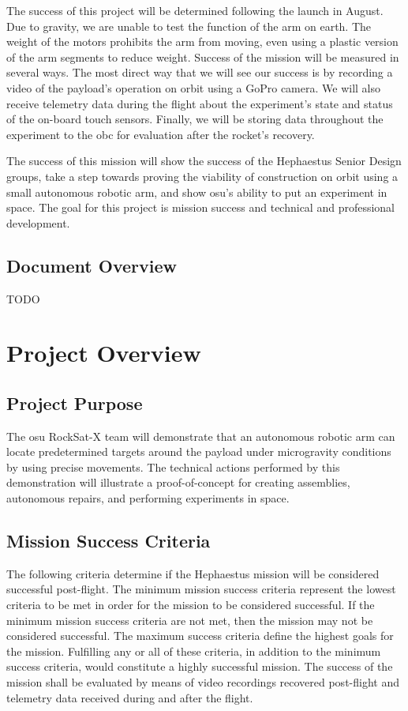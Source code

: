 \documentclass[letterpaper,10pt]{article}
\begin{document}
The success of this project will be determined following the launch in August.
Due to gravity, we are unable to test the function of the arm on earth.
The weight of the motors prohibits the arm from moving, even using a plastic 
version of the arm segments to reduce weight. 
Success of the mission will be measured in several ways.
The most direct way that we will see our success is by recording a video of the 
\gls{payload}'s operation on orbit using a GoPro camera. 
We will also receive telemetry data during the flight about the experiment's 
state and status of the on-board touch sensors. 
Finally, we will be storing data throughout the experiment to the \gls{obc} for
evaluation after the rocket's recovery.

The success of this mission will show the success of the Hephaestus Senior 
Design groups, take a step towards proving the viability of construction
on orbit using a small autonomous robotic arm, and show \gls{osu}'s ability to
put an experiment in space. 
The goal for this project is mission success and technical and professional 
development.

\subsection{Document Overview}
TODO

\section{Project Overview}
\subsection{Project Purpose}
The \gls{osu} RockSat-X team will demonstrate that an autonomous robotic arm 
can locate predetermined targets around the \gls{payload} under 
\gls{microgravity} conditions by using precise movements.
The technical actions performed by this demonstration will illustrate a 
proof-of-concept for creating assemblies, autonomous repairs, and performing 
experiments in space.

\subsection{Mission Success Criteria}
The following criteria determine if the Hephaestus mission will be considered 
successful post-flight.
The minimum mission success criteria represent the lowest criteria to be met 
in order for the mission to be considered successful.
If the minimum mission success criteria are not met, then the mission may not 
be considered successful.
The maximum success criteria define the highest goals for the mission.
Fulfilling any or all of these criteria, in addition to the minimum success 
criteria, would constitute a highly successful mission.
The success of the mission shall be evaluated by means of video recordings 
recovered post-flight and telemetry data received during and after the flight.
\end{document}
